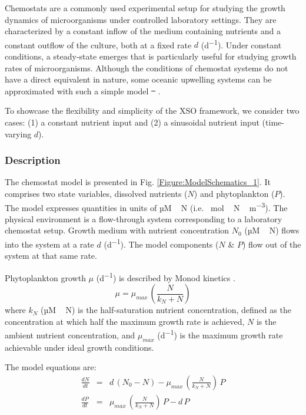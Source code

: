 \documentclass[gmd, manuscript]{copernicus}
\providecommand{\DIFadd}[1]{{\protect\color{blue}\uwave{#1}}} %
\providecommand{\DIFdel}[1]{{\protect\color{red}\sout{#1}}}                      %
\providecommand{\DIFaddbegin}{} %
\providecommand{\DIFaddend}{} %
\providecommand{\DIFdelbegin}{} %
\providecommand{\DIFdelend}{} %
\begin{document}
Chemostats are a commonly used experimental setup for studying the growth dynamics of microorganisms under controlled laboratory settings. They are characterized by a constant inflow of the medium containing nutrients and a constant outflow of the culture, both at a fixed rate $d$ (\unit{d^{-1}}). Under constant conditions, a steady-state emerges that is particularly useful for studying growth rates of microorganisms. Although the conditions of chemostat systems do not have a direct equivalent in nature, some oceanic upwelling systems can be approximated with such a simple model \DIFdelbegin \DIFdel{\mbox{%
\citep{Haefner2005ModelingApplications}}\hskip0pt%
}\DIFdelend \DIFaddbegin \DIFadd{\mbox{%
\citep{Evans1985ACycles}}\hskip0pt%
}\DIFaddend .

To showcase the flexibility and simplicity of the XSO framework, we consider two cases: (1) a constant nutrient input and (2) a sinusoidal nutrient input (time-varying $d$).

\subsubsection{Description}
The chemostat model is presented in Fig. \ref{Figure:ModelSchematics_1}. It comprises two state variables, dissolved nutrients ($N$) and phytoplankton ($P$). The model expresses quantities in units of \unit{µM\,N} (i.e. \unit{\mu mol\,N\,m^{-3}}). The physical environment is a flow-through system corresponding to a laboratory chemostat setup. Growth medium with nutrient concentration $N_0$ (\unit{µM\,N}) flows into the system at a rate $d$ (\unit{d^{-1}}). The model components ($N$ \& $P$) flow out of the system at that same rate.

Phytoplankton growth $\mu$ (\unit{d^{-1}}) is described by Monod kinetics \citep{Monod1942RecherchesBacteriennes}.
\begin{equation}
    \label{Eq:ChemoMU}
    \mu = \mu_{max}\,\left(\frac{N}{k_N + N}\right) 
\end{equation}
where $k_N$ (\unit{µM\,N}) is the half-saturation nutrient concentration, defined as the concentration at which half the maximum growth rate is achieved, $N$ is the ambient nutrient concentration, and $\mu_{max}$ (\unit{d^{-1}}) is the maximum growth rate achievable under ideal growth conditions.

The model equations are:
\begin{eqnarray}
\label{Eq:ChemoN}
\frac{d N}{d t} & = & d\,(N_0 - N) -\mu_{max}\,\left(\frac{N}{k_N + N}\right)\, P \\ 
\frac{d P}{d t} & = & \mu_{max}\,\left(\frac{N}{k_N + N}\right)\,P - d\,P \label{Eq:ChemoP}
\end{eqnarray}
\end{document}
